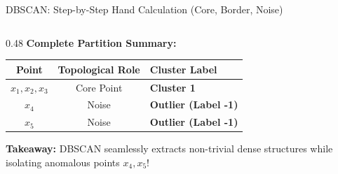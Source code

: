 \documentclass[aspectratio=169,10pt]{beamer}
\begin{document}
\begin{frame}{DBSCAN: Step-by-Step Hand Calculation (Core, Border, Noise)}
\begin{columns}[T]
\begin{column}{0.48\textwidth}
      \vspace{0.2em}
      \textbf{Complete Partition Summary:}
      \begin{table}[]
        \centering
        \begin{tabular}{c c l}
          \toprule
          \textbf{Point} & \textbf{Topological Role} & \textbf{Cluster Label} \\
          \midrule
          $x_1, x_2, x_3$ & Core Point & \textbf{Cluster 1} \\
          $x_4$ & Noise & \textbf{Outlier (Label -1)} \\
          $x_5$ & Noise & \textbf{Outlier (Label -1)} \\
          \bottomrule
        \end{tabular}
      \end{table}
      \textbf{Takeaway:} DBSCAN seamlessly extracts non-trivial dense structures while isolating anomalous points $x_4, x_5$!
    \end{column}
  \end{columns}
\end{frame}
\end{document}
